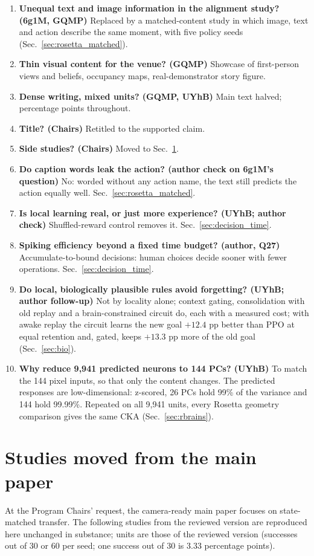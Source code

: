 \documentclass[10pt,onecolumn,letterpaper]{article}
\begin{document}
\begin{small}
\begin{enumerate}
\item \textbf{Unequal text and image information in the alignment study? (6g1M, GQMP)} Replaced by a matched-content
study in which image, text and action describe the same moment, with five policy seeds (Sec.~\ref{sec:rosetta_matched}).
\item \textbf{Thin visual content for the venue? (GQMP)} Showcase of first-person views and beliefs, occupancy maps,
real-demonstrator story figure.
\item \textbf{Dense writing, mixed units? (GQMP, UYhB)} Main text halved; percentage points throughout.
\item \textbf{Title? (Chairs)} Retitled to the supported claim.
\item \textbf{Side studies? (Chairs)} Moved to Sec.~\ref{sec:moved_from_main}.
\item \textbf{Do caption words leak the action? (author check on 6g1M's question)} No: worded without any action
name, the text still predicts the action equally well. Sec.~\ref{sec:rosetta_matched}.
\item \textbf{Is local learning real, or just more experience? (UYhB; author check)} Shuffled-reward control removes
it. Sec.~\ref{sec:decision_time}.
\item \textbf{Spiking efficiency beyond a fixed time budget? (author, Q27)} Accumulate-to-bound decisions: human choices
decide sooner with fewer operations. Sec.~\ref{sec:decision_time}.
\item \textbf{Do local, biologically plausible rules avoid forgetting? (UYhB; author follow-up)} Not by locality alone;
context gating, consolidation with old replay and a brain-constrained circuit do, each with a measured cost; with
awake replay the circuit learns the new goal $+12.4$ pp better than PPO at equal retention and, gated, keeps $+13.3$ pp more of the old goal
(Sec.~\ref{sec:bio}).
\item \textbf{Why reduce 9,941 predicted neurons to 144 PCs? (UYhB)} To match the 144 pixel inputs, so that only the
content changes. The predicted responses are low-dimensional: z-scored, 26 PCs hold 99\% of the variance and 144 hold
99.99\%. Repeated on all 9,941 units, every Rosetta geometry comparison gives the same CKA (Sec.~\ref{sec:rbrains}).
\end{enumerate}
\end{small}

\section{Studies moved from the main paper}
\label{sec:moved_from_main}
At the Program Chairs' request, the camera-ready main paper focuses on state-matched transfer. The following studies
from the reviewed version are reproduced here unchanged in substance; units are those of the reviewed version
(successes out of 30 or 60 per seed; one success out of 30 is 3.33 percentage points).
\end{document}
